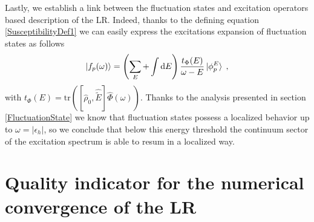 \documentclass[reprint,aps,prb]{revtex4-1}
\newcommand{\dd}{{\rm d}}
\newcommand{\eps}{\epsilon}
\newcommand{\be}{\begin{equation}}
\newcommand{\ee}{\end{equation}}
\newcommand{\nn}{\notag}
\newcommand{\lb}{\label}
\newcommand{\op}[1]{\hat {#1}}
\newcommand{\commutator}[2]{\left[ {#1} , {#2} \right]}
\newcommand{\trace}[1]{\mathrm{tr}\left(#1\right)}
\newcommand{\dmnot}{\op{\rho}_0}
\begin{document}
Lastly, we establish a link between the fluctuation states and excitation operators based description of the LR. Indeed, thanks to the defining equation \eqref{SusceptibilityDef1} we can 
easily express the excitations expansion of fluctuation states as follows 
\be\lb{FluctuationStateExcitationDef1}
\ket{f_p(\omega)}   =
\left(\sum_E + \int\dd E   \right) 
\frac{t_\Phi(E)}{\omega-E} \ket{\phi^E_p} \;,
\ee 
with $t_\Phi(E)=\trace{\commutator{\dmnot}{\op{\tilde E}}\op\Phi(\omega)}$. 
Thanks to the analysis presented in section \ref{FluctuationState} we know that fluctuation states possess a localized behavior up to $\omega=|\eps_h|$, so we conclude that 
below this energy threshold the continuum sector of the excitation spectrum is able to resum in a localized way.  





\section{Quality indicator for the numerical convergence of the LR}   %
\end{document}

